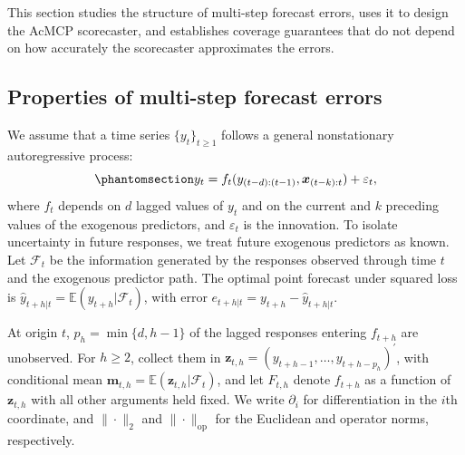 \documentclass[
  american,
  12pt]{article}
\theoremstyle{plain}
\theoremstyle{plain}
\theoremstyle{remark}
\begin{document}
This section studies the structure of multi-step forecast errors, uses
it to design the AcMCP scorecaster, and establishes coverage guarantees
that do not depend on how accurately the scorecaster approximates the
errors.

\subsection{Properties of multi-step forecast errors}\label{sec-ppt}

We assume that a time series \(\{y_t\}_{t \geq 1}\) follows a general
nonstationary autoregressive process:
\begin{equation}\phantomsection\label{eq-dgp}{
y_t = f_{t}(y_{(t-d):(t-1)}, \bm{x}_{(t-k):t}) + \varepsilon_t,
}\end{equation} where \(f_{t}\) depends on \(d\) lagged values of
\(y_t\) and on the current and \(k\) preceding values of the exogenous
predictors, and \(\varepsilon_t\) is the innovation. To isolate
uncertainty in future responses, we treat future exogenous predictors as
known. Let \(\mathcal F_t\) be the information generated by the
responses observed through time \(t\) and the exogenous predictor path.
The optimal point forecast under squared loss is
\(\hat y_{t+h|t}=\mathbb E(y_{t+h}|\mathcal F_t)\), with error
\(e_{t+h|t}=y_{t+h}-\hat y_{t+h|t}\).

At origin \(t\), \(p_h=\min\{d,h-1\}\) of the lagged responses entering
\(f_{t+h}\) are unobserved. For \(h\geq2\), collect them in
\(\bm z_{t,h}=(y_{t+h-1},\dots,y_{t+h-p_h})^{\prime}\), with conditional
mean \(\bm m_{t,h}=\mathbb E(\bm z_{t,h}|\mathcal F_t)\), and let
\(F_{t,h}\) denote \(f_{t+h}\) as a function of \(\bm z_{t,h}\) with all
other arguments held fixed. We write \(\partial_i\) for differentiation
in the \(i\)th coordinate, and \(\|\cdot\|_2\) and
\(\|\cdot\|_{\mathrm{op}}\) for the Euclidean and operator norms,
respectively.
\end{document}
